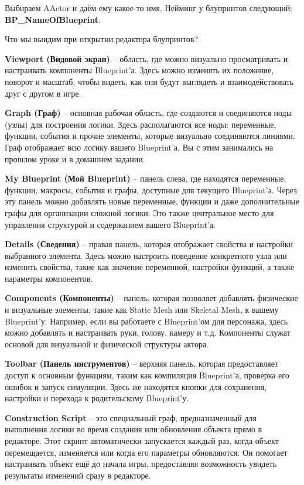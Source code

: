 Выбираем AActor и даём ему какое-то имя. Нейминг у блупринтов следующий: 
\textbf{BP\_NameOfBlueprint}.

Что мы выидим при открытии редактора блупринтов?

\textbf{Viewport (Видовой экран)} – область, где можно визуально просматривать 
и настраивать компоненты Blueprint'а. Здесь можно изменять их положение, поворот 
и масштаб, чтобы видеть, как они будут выглядеть и взаимодействовать друг с 
другом в игре.

\textbf{Graph (Граф)} – основная рабочая область, где создаются и соединяются ноды 
(узлы) для построения логики. Здесь располагаются все ноды: переменные, функции, 
события и прочие элементы, которые визуально соединяются линиями. 
Граф отображает всю логику вашего Blueprint'а. Вы с этим занимались на прошлом уроке
и в домашнем задании.

\textbf{My Blueprint (Мой Blueprint)} – панель слева, где находятся переменные, 
функции, макросы, события и графы, доступные для текущего Blueprint'а. 
Через эту панель можно добавлять новые переменные, функции и даже дополнительные 
графы для организации сложной логики. Это также центральное место для управления 
структурой и содержанием вашего Blueprint'а.

\textbf{Details (Сведения)} – правая панель, которая отображает свойства и 
настройки выбранного элемента. Здесь можно 
настроить поведение конкретного узла или изменить свойства, такие как значение 
переменной, настройки функций, а также параметры компонентов.

\textbf{Components (Компоненты)} – панель, которая позволяет добавлять физические 
и визуальные элементы, такие как Static Mesh или Skeletal Mesh, к вашему 
Blueprint'у. Например, если вы работаете с Blueprint'ом для персонажа, здесь 
можно добавлять и настраивать руки, голову, камеру и т.д. Компоненты служат 
основой для визуальной и физической структуры актора.

\textbf{Toolbar (Панель инструментов)} – верхняя панель, которая предоставляет доступ к 
основным функциям, таким как компиляция Blueprint'а, проверка его ошибок и 
запуск симуляции. Здесь же находятся кнопки для сохранения, настройки и 
перехода к родительскому Blueprint'у.

\textbf{Construction Script} – это специальный граф, предназначенный для выполнения
логики во время создания или обновления объекта прямо в редакторе. Этот скрипт 
автоматически запускается каждый раз, когда объект перемещается, изменяется или 
когда его параметры обновляются. Он помогает настраивать объект ещё до начала игры,
предоставляя возможность увидеть результаты изменений сразу в редакторе.

